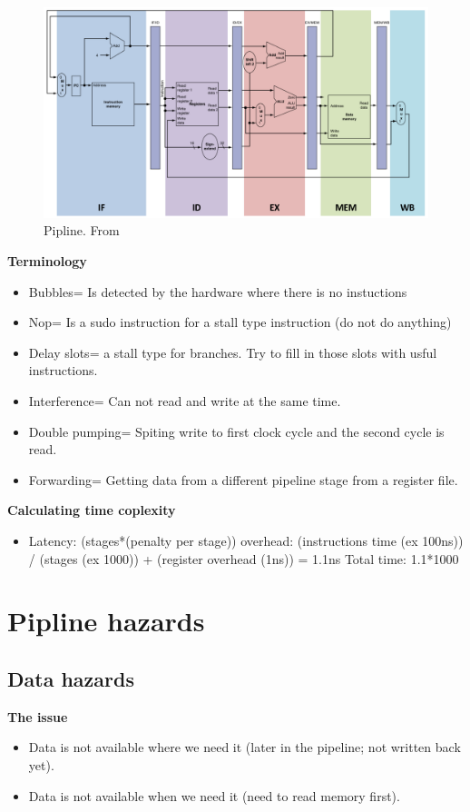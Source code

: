 \begin{figure}[H]
    \centering
    \includegraphics[width=16cm]{image/pipline.png} 
    \caption{Pipline. From \cite{ca}}
    \label{pipline}
\end{figure}


\textbf{Terminology}
\begin{itemize}
\item  Bubbles= Is detected by the hardware where there is no instuctions
\item  Nop= Is a sudo instruction for a stall type instruction (do not do anything)
\item  Delay slots= a stall type for branches. Try to fill in those slots with usful instructions.
\item  Interference= Can not read and write at the same time.
\item  Double pumping= Spiting write to first clock cycle and the second cycle is read.
\item  Forwarding= Getting data from a different pipeline stage from a register file.
\end{itemize}


\textbf{Calculating time coplexity}
\begin{itemize}
\item  Latency: (stages*(penalty per stage)) \newline
  overhead: (instructions time (ex 100ns)) / (stages (ex 1000)) + (register overhead (1ns)) = 1.1ns
  Total time: 1.1*1000
\end{itemize}



\section{Pipline hazards}

\subsection{Data hazards}
\textbf{The issue}
\begin{itemize}
\item  Data is not available where we need it (later in the pipeline; not written back yet).
\item  Data is not available when we need it (need to read memory first).
\end{itemize}

